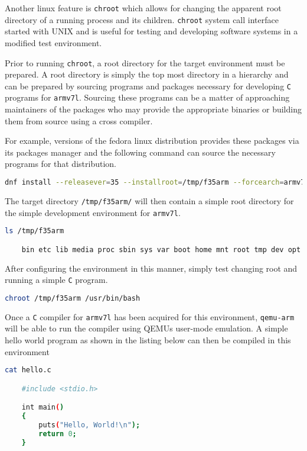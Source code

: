 Another linux feature is \texttt{chroot} which allows for changing the apparent root directory of a running process and its children. \texttt{chroot} system call interface started with UNIX and is useful for testing and developing software systems in a modified test environment.

Prior to running \texttt{chroot}, a root directory for the target environment must be prepared. A root directory is simply the top most directory in a hierarchy and can be prepared by sourcing programs and packages necessary for developing \texttt{C} programs for \texttt{armv7l}. Sourcing these programs can be a matter of approaching maintainers of the packages who may provide the appropriate binaries or building them from source using a cross compiler.

For example, versions of the fedora linux distribution provides these packages via its packages manager and the following command can source the necessary programs for that distribution.

\begin{lstlisting}[language=Bash]
	dnf install --releasever=35 --installroot=/tmp/f35arm --forcearch=armv7hl --repo=fedora --repo=updates systemd passwd dnf fedora-release vim-minimal m4 cmake gcc-c++ tar gcc git make tmux -y
\end{lstlisting}

The target directory \texttt{/tmp/f35arm/} will then contain a simple root directory for the simple development environment for \texttt{armv7l}.

\begin{lstlisting}[language=Bash]
	ls /tmp/f35arm

	bin etc lib media proc sbin sys var boot home mnt root tmp dev opt usr
\end{lstlisting}

After configuring the environment in this manner, simply test changing root and running a simple \texttt{C} program.

\begin{lstlisting}[language=Bash]
	chroot /tmp/f35arm /usr/bin/bash
\end{lstlisting}

Once a \texttt{C} compiler for \texttt{armv7l} has been acquired for this environment, \texttt{qemu-arm} will be able to run the compiler using QEMU\textquotesingle s user-mode emulation. A simple hello world program as shown in the listing below can then be compiled in this environment

\begin{lstlisting}[language=Bash]
	cat hello.c

	#include <stdio.h>

	int main()
	{
		puts("Hello, World!\n");
		return 0;
	}
\end{lstlisting}

